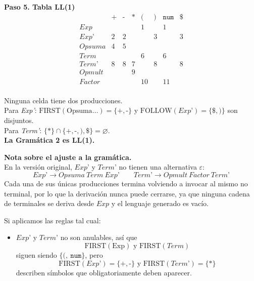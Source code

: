 \documentclass[12pt,letterpaper]{article}
\newcommand{\nt}[1]{\textit{#1}}
\newcommand{\tk}[1]{\texttt{#1}}
\newcommand{\tx}[1]{\text{#1}}
\newcommand{\First}[1]{\mathrm{FIRST}(#1)}
\newcommand{\Follow}[1]{\mathrm{FOLLOW}(#1)}
\newcommand{\eps}{\varepsilon}
\begin{document}
\begin{enumerate}[label=\arabic*.]
\begin{itemize}
    \bigskip
    
    \textbf{Paso 5. Tabla LL(1)}
    \[
    \begin{array}{c|c|c|c|c|c|c|c}
      & \tk{+} & \tk{-} & \tk{*} & \tk{(} & \tk{)} & \tk{num} & \tk{\$} \\ \hline
      \nt{Exp}     &   &   &   & 1  &   & 1  &   \\ \hline
      \nt{Exp'}    & 2 & 2 &   &    & 3 &    & 3 \\ \hline
      \nt{Opsuma}  & 4 & 5 &   &    &   &    &   \\ \hline
      \nt{Term}    &   &   &   & 6  &   & 6  &   \\ \hline
      \nt{Term'}   & 8 & 8 & 7 &    & 8 &    & 8 \\ \hline
      \nt{Opmult}  &   &   & 9 &    &   &    &   \\ \hline
      \nt{Factor}  &   &   &   & 10 &   & 11 &   \\
    \end{array}
    \]

    Ninguna celda tiene dos producciones.\\
    Para \nt{Exp'}:
    $\First{\tx{Opsuma}\ldots}=\{\tk{+},\tk{-}\}$ y $\Follow{\nt{Exp'}}=\{\tk{\$},\tk{)}\}$ son disjuntos.\\
    Para \nt{Term'}: $\{\tk{*}\}\cap\{\tk{+},\tk{-},\tk{)},\tk{\$}\}=\varnothing$.\\
    
    \textbf{La Gramática 2 es LL(1).}\\

    \newpage
    
    \textbf{Nota sobre el ajuste a la gramática.}\\
    En la versión original, $\nt{Exp'}$ y $\nt{Term'}$ no tienen una alternativa $\eps$:
    \[
    \nt{Exp'} \to \nt{Opsuma}\ \nt{Term}\ \nt{Exp'}
    \qquad
    \nt{Term'} \to \nt{Opmult}\ \nt{Factor}\ \nt{Term'}
    \]
    Cada una de sus únicas producciones termina volviendo a invocar al mismo no terminal, por lo que
    la derivación nunca puede cerrarse, ya que ninguna cadena de terminales se deriva desde $\nt{Exp}$ y el
    lenguaje generado es vacío.

    Si aplicamos las reglas tal cual:
    \begin{itemize}
    \item $\nt{Exp'}$ y $\nt{Term'}$ no son anulables, así que
      \[
      \First{\tx{Exp}} \text{ y } \First{\nt{Term}}
      \]
      siguen siendo $\{\tk{(},\ \tk{num}\}$, pero
      \[
      \First{\nt{Exp'}}=\{\tk{+},\tk{-}\} \text{ y } \First{\nt{Term'}}=\{\tk{*}\}
      \]
      describen símbolos que obligatoriamente deben aparecer.


\end{itemize}
\end{itemize}
\end{enumerate}
\end{document}
